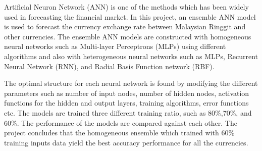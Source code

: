 

Artificial Neuron Network (ANN) is one of the methods which has been widely used in forecasting the financial market.  In this project, an ensemble ANN model is used to forecast the currency exchange rate between Malaysian Ringgit and other currencies. The ensemble ANN models are constructed with homogeneous neural networks such as Multi-layer Perceptrons (MLPs) using different algorithms and also with heterogeneous neural networks such as MLPs, Recurrent Neural Network (RNN), and Radial Basis  Function network (RBF).

The optimal structure for each neural network is found by modifying the different parameters such as number of input nodes, number of hidden nodes, activation functions for the hidden and output layers, training algorithms, error functions etc. The models are trained three different training ratio, such as 80\%,70\%, and 60\%. The performance of the models are compared against each other. The project concludes that the homogeneous ensemble which trained with 60\% training inputs data yield the best accuracy performance for all the currencies. 